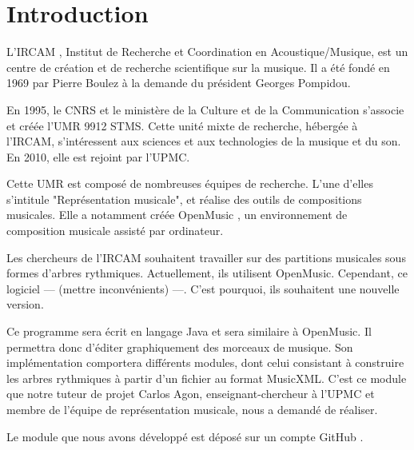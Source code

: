 \section{Introduction}


L'IRCAM \cite{ircam}, Institut de Recherche et Coordination en Acoustique/Musique, est un centre de création et de recherche scientifique sur la musique. Il a été fondé en 1969 par Pierre Boulez à la demande du président Georges Pompidou. 

\par
En 1995, le CNRS et le ministère de la Culture et de la Communication s'associe et créée l'UMR 9912 STMS. Cette unité mixte de recherche, hébergée à l'IRCAM, s'intéressent aux sciences et aux technologies de la musique et du son. En 2010, elle est rejoint par l'UPMC.

\par
Cette UMR est composé de nombreuses équipes de recherche. L'une d'elles s'intitule "Représentation musicale", et réalise des outils de compositions musicales. Elle a notamment créée OpenMusic \cite{openmusic}, un environnement de composition musicale assisté par ordinateur.

\par
Les chercheurs de l'IRCAM souhaitent travailler sur des partitions musicales sous formes d'arbres rythmiques. Actuellement, ils utilisent OpenMusic. Cependant, ce logiciel --- (mettre inconvénients) ---. C'est pourquoi, ils souhaitent une nouvelle version. 

\par
Ce programme sera écrit en langage Java et sera similaire à OpenMusic. Il permettra donc d'éditer graphiquement des morceaux de musique. Son implémentation comportera différents modules, dont celui consistant à construire les arbres rythmiques à partir d'un fichier au format MusicXML. C'est ce module que notre tuteur de projet Carlos Agon, enseignant-chercheur à l'UPMC et membre de l'équipe de représentation musicale, nous a demandé de réaliser.

\par
Le module que nous avons développé est déposé sur un compte GitHub \cite{github_pstl}.
